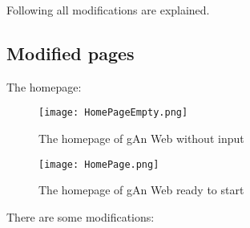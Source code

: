 Following all modifications are explained.

\subsection{Modified pages}
The homepage:

\begin{figure}[H]
\centering
\texttt{[image: HomePageEmpty.png]} 
\caption{The homepage of gAn Web without input}
\end{figure}


\begin{figure}[H]
\centering
\texttt{[image: HomePage.png]} 
\caption{The homepage of gAn Web ready to start}
\end{figure}

There are some modifications:

